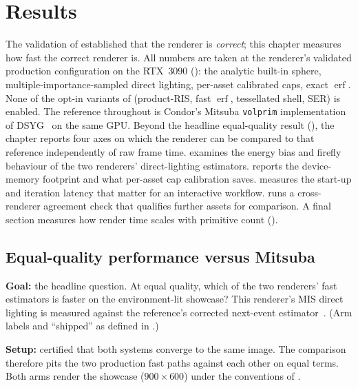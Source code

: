 \chapter{Results}
\label{ch:results}

The validation of  established that the renderer is \emph{correct}; this chapter
measures how fast the correct renderer is. All numbers are taken at the renderer's
validated production configuration on the RTX~3090 (): the analytic built-in sphere,
multiple-importance-sampled direct lighting, per-asset calibrated caps, exact
\(\operatorname{erf}\). None of the opt-in variants of  (product-RIS,
fast \(\operatorname{erf}\), tessellated shell, SER) is enabled. The
reference throughout is Condor's Mitsuba \texttt{volprim} implementation of
DSYG~\cite{DSYG} on the same GPU. Beyond the headline equal-quality result (),
the chapter reports four axes on which the renderer can be compared to that reference independently
of raw frame time.  examines the energy bias and firefly behaviour of the
two renderers' direct-lighting estimators.  reports the device-memory footprint
and what per-asset cap calibration saves.  measures the start-up and
iteration latency that matter for an interactive workflow.  runs a
cross-renderer agreement check that qualifies further assets for comparison. A final section measures how render time scales with primitive count
().

\section{Equal-quality performance versus Mitsuba}
\label{sec:results-perf}

\textbf{Goal:} the headline question. At equal quality, which of the two renderers' fast
estimators is faster on the environment-lit showcase? This renderer's MIS direct lighting is
measured against the reference's corrected next-event
estimator~\cite{KramarzVolprimFixes2026}. (Arm labels and ``shipped'' as defined in
.)

\textbf{Setup:}  certified that
both systems converge to the same image. The comparison therefore pits the two production
fast paths against each other on equal terms. Both arms render the showcase ($900\times600$) under the
conventions of .

